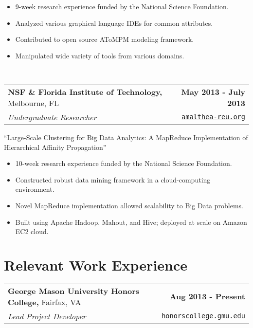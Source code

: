 \documentclass[letterpaper]{article}
\newenvironment{details}
{\begin{itemize}}
{\end{itemize}}
\begin{document}

  \begin{details}
  \item 9-week research experience funded by the National Science Foundation.
  \item Analyzed various graphical language IDEs for common attributes.
  \item Contributed to open source AToMPM modeling framework.
  \item Manipulated wide variety of tools from various domains.
  \end{details}~\\[0.1em]

  \noindent
  \begin{tabularx}{\textwidth}{@{}X r@{}}
    \textbf{NSF \& Florida Institute of Technology,} Melbourne, FL & \textbf{May 2013 - July 2013} \\
    \emph{Undergraduate Researcher} & \texttt{\href{amalthea-reu.org}{amalthea-reu.org}}
  \end{tabularx}

  \noindent\begin{center}``Large-Scale Clustering for Big Data Analytics: A MapReduce Implementation of Hierarchical Affinity Propagation''\end{center}

  \begin{details}
  \item 10-week research experience funded by the National Science Foundation.
  \item Constructed robust data mining framework in a cloud-computing environment.
  \item Novel MapReduce implementation allowed scalability to Big Data problems.
  \item Built using Apache Hadoop, Mahout, and Hive; deployed at scale on Amazon EC2 cloud.
  \end{details}


  \section{Relevant Work Experience}

  \noindent
  \begin{tabularx}{\textwidth}{@{}X r@{}}
    \textbf{George Mason University Honors College,} Fairfax, VA & \textbf{Aug 2013 - Present} \\
    \emph{Lead Project Developer} & \texttt{\href{http://honorscollege.gmu.edu/collegeresearch}{honorscollege.gmu.edu}} \\[0.2cm]
  \end{tabularx}
\end{document}
